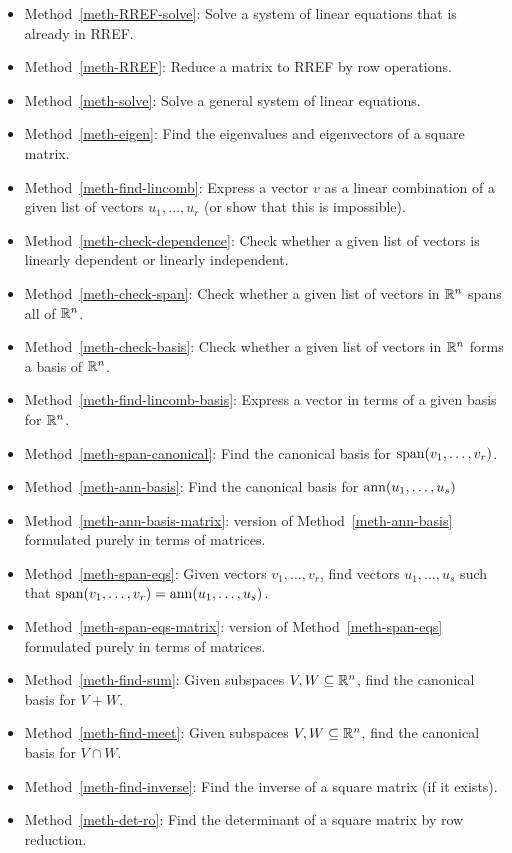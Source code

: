 \documentclass[reqno]{amsart}
\theoremstyle{definition}
\begin{document}
\begin{itemize}
 \item Method~\ref{meth-RREF-solve}:
  Solve a system of linear equations that is already in RREF.
 \item Method~\ref{meth-RREF}:
  Reduce a matrix to RREF by row operations.
 \item Method~\ref{meth-solve}:
  Solve a general system of linear equations.
 \item Method~\ref{meth-eigen}:
  Find the eigenvalues and eigenvectors of a square matrix.
 \item Method~\ref{meth-find-lincomb}:
  Express a vector $v$ as a linear combination of a given list of
  vectors $u_1,\dotsc,u_r$ (or show that this is impossible).
 \item Method~\ref{meth-check-dependence}:
  Check whether a given list of vectors is linearly dependent or
  linearly independent.
 \item Method~\ref{meth-check-span}:
  Check whether a given list of vectors in ${\mathbb{R}}^n$ spans all of ${\mathbb{R}}^n$.
 \item Method~\ref{meth-check-basis}:
  Check whether a given list of vectors in ${\mathbb{R}}^n$ forms a basis of ${\mathbb{R}}^n$.
 \item Method~\ref{meth-find-lincomb-basis}: Express a vector in terms
  of a given basis for ${\mathbb{R}}^n$.
 \item Method~\ref{meth-span-canonical}: Find the canonical basis for
  $\operatorname{span}(v_1,\dotsc,v_r)$.
 \item Method~\ref{meth-ann-basis}: Find the canonical basis for
  $\operatorname{ann}(u_1,\dotsc,u_s)$
 \item Method~\ref{meth-ann-basis-matrix}: version of
  Method~\ref{meth-ann-basis} formulated purely in terms of matrices.
 \item Method~\ref{meth-span-eqs}: Given vectors $v_1,\dotsc,v_r$,
  find vectors $u_1,\dotsc,u_s$ such that
  $\operatorname{span}(v_1,\dotsc,v_r)=\operatorname{ann}(u_1,\dotsc,u_s)$.
 \item Method~\ref{meth-span-eqs-matrix}: version of
  Method~\ref{meth-span-eqs} formulated purely in terms of matrices.
 \item Method~\ref{meth-find-sum}: Given subspaces $V,W\subseteq{\mathbb{R}}^n$, find
  the canonical basis for $V+W$.
 \item Method~\ref{meth-find-meet}: Given subspaces $V,W\subseteq{\mathbb{R}}^n$, find
  the canonical basis for $V\cap W$.
 \item Method~\ref{meth-find-inverse}: Find the inverse of a square
  matrix (if it exists).
 \item Method~\ref{meth-det-ro}: Find the determinant of a square
  matrix by row reduction.
\end{itemize}
\end{document}
